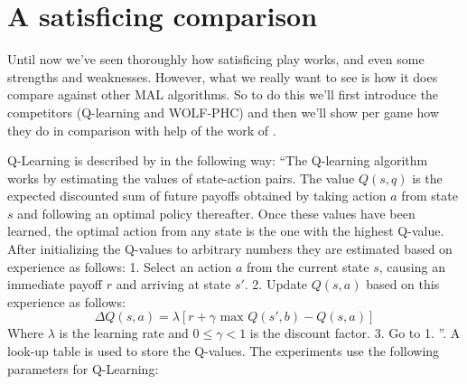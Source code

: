 \noindent
{}

\section{A satisficing comparison}
\cleared Until now we've seen thoroughly how satisficing play works, and even some
strengths and weaknesses. However, what we really want to see is how it does
compare against other MAL algorithms. So to do this we'll first introduce the
competitors (Q-learning and WOLF-PHC) and then we'll show per game how they
do in comparison with help of the work of \citep{crandall}.

\cleared Q-Learning is described by \citep{sandholm} in the following way: ``The
Q-learning algorithm works by estimating the values of state-action pairs. The
value $Q(s,q)$ is the expected discounted sum of future payoffs obtained by taking
action $a$ from state $s$ and following an optimal policy thereafter.
Once these values have been learned, the optimal action from any state
is the one with the highest Q-value. After initializing the Q-values to arbitrary
numbers they are estimated based on experience as follows: 1. Select an action
$a$ from the current state $s$, causing an immediate payoff $r$ and arriving at
state $s'$. 2. Update $Q(s,a)$ based on this experience as follows:
\[\Delta Q(s,a) = \lambda[r+\gamma \text{ max }Q(s',b)-Q(s,a)]\]
Where $\lambda$ is the learning rate and $0 \leq \gamma < 1$ is the discount
factor.
3. Go to 1.
''. A look-up table is used to store the Q-values. The experiments use the
following parameters for Q-Learning:

